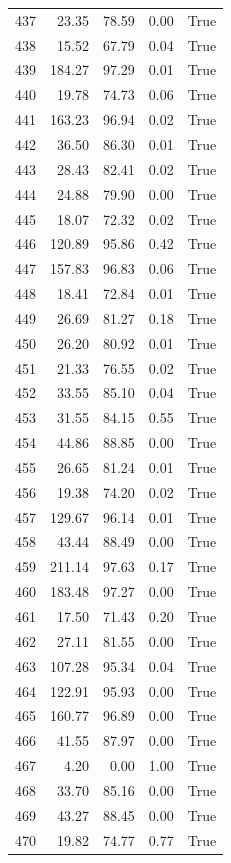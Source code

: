 \begin{longtable}{rrrrr}
437 & 23.35 & 78.59 & 0.00 & True \\
438 & 15.52 & 67.79 & 0.04 & True \\
439 & 184.27 & 97.29 & 0.01 & True \\
440 & 19.78 & 74.73 & 0.06 & True \\
441 & 163.23 & 96.94 & 0.02 & True \\
442 & 36.50 & 86.30 & 0.01 & True \\
443 & 28.43 & 82.41 & 0.02 & True \\
444 & 24.88 & 79.90 & 0.00 & True \\
445 & 18.07 & 72.32 & 0.02 & True \\
446 & 120.89 & 95.86 & 0.42 & True \\
447 & 157.83 & 96.83 & 0.06 & True \\
448 & 18.41 & 72.84 & 0.01 & True \\
449 & 26.69 & 81.27 & 0.18 & True \\
450 & 26.20 & 80.92 & 0.01 & True \\
451 & 21.33 & 76.55 & 0.02 & True \\
452 & 33.55 & 85.10 & 0.04 & True \\
453 & 31.55 & 84.15 & 0.55 & True \\
454 & 44.86 & 88.85 & 0.00 & True \\
455 & 26.65 & 81.24 & 0.01 & True \\
456 & 19.38 & 74.20 & 0.02 & True \\
457 & 129.67 & 96.14 & 0.01 & True \\
458 & 43.44 & 88.49 & 0.00 & True \\
459 & 211.14 & 97.63 & 0.17 & True \\
460 & 183.48 & 97.27 & 0.00 & True \\
461 & 17.50 & 71.43 & 0.20 & True \\
462 & 27.11 & 81.55 & 0.00 & True \\
463 & 107.28 & 95.34 & 0.04 & True \\
464 & 122.91 & 95.93 & 0.00 & True \\
465 & 160.77 & 96.89 & 0.00 & True \\
466 & 41.55 & 87.97 & 0.00 & True \\
467 & 4.20 & 0.00 & 1.00 & True \\
468 & 33.70 & 85.16 & 0.00 & True \\
469 & 43.27 & 88.45 & 0.00 & True \\
470 & 19.82 & 74.77 & 0.77 & True \\

\end{longtable}
